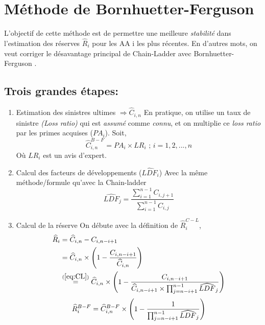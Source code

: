 \newpage
\section{Méthode de Bornhuetter-Ferguson}

L'objectif de cette méthode est de permettre une meilleure \emph{stabilité} dans l'estimation des réserves $\widehat{R}_i $ pour les AA i les plus récentes.
En d'autres mots, on veut corriger le désavantage principal de Chain-Ladder avec Bornhuetter-Ferguson .

\subsection*{Trois grandes étapes:}
\begin{enumerate}
\item Estimation des sinistres ultimes $\Rightarrow \widehat{C}_{i,n}$ \newline
En pratique, on utilise un taux de sinistre \emph{(Loss ratio)} qui est \textit{assumé} comme \textit{connu}, et on multiplie ce \emph{loss ratio} par les primes acquises ($PA_i$). Soit,
$$ \widehat{C}_{i,n}^{B-F} = PA_i \times LR_i \text{ ; } i = 1,2,...,n$$ 
Où $LR_i$ est un avis d'expert.

\item Calcul des facteurs de développements ($\widehat{LDF}_i$) \newline
Avec la même méthode/formule qu'avec la Chain-ladder
$$ \widehat{LDF}_j = \frac{\sum_{i = 1}^{n-1} C_{i, j+1}}{\sum_{i = 1}^{n-1} C_{i, j}}$$

\item Calcul de la réserve \newline
On débute avec la définition de $\widehat{R}_i^{C-L}$,
\begin{align*}
\widehat{R}_i &= \widehat{C}_{i,n} - C_{i, n-i+1} \\
&= \widehat{C}_{i,n} \times \Bigg( 1 - \frac{C_{i, n-i+1}}{\widehat{C}_{i,n}}\Bigg) \\
&\overset{(\ref{eq:CL})}{=} \widehat{C}_{i,n} \times \Bigg( 1 - \frac{C_{i, n-i+1}}{\widehat{C}_{i,n -i + 1} \times \prod_{j = n - i + 1}^{n- 1} \widehat{LDF}_j}\Bigg)  \\
\end{align*}
\begin{equation}
\label{eq:BFmet}
\widehat{R}_i^{B-F} = \widehat{C}_{i,n}^{B-F} \times \Bigg( 1 - \frac{1}{\prod_{j = n - i + 1}^{n- 1} \widehat{LDF}_j}\Bigg)  \\
\end{equation}
\end{enumerate}

